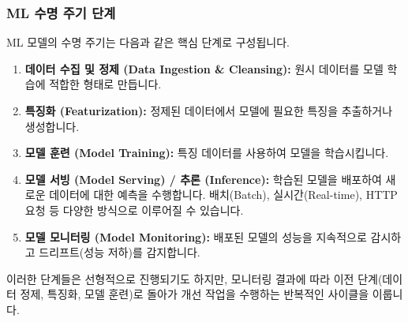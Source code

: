 \documentclass[11pt,a4paper]{article}
\begin{document}
\subsubsection*{ML 수명 주기 단계}
ML 모델의 수명 주기는 다음과 같은 핵심 단계로 구성됩니다.
\begin{enumerate}
    \item \textbf{데이터 수집 및 정제 (Data Ingestion & Cleansing):} 원시 데이터를 모델 학습에 적합한 형태로 만듭니다.
    \item \textbf{특징화 (Featurization):} 정제된 데이터에서 모델에 필요한 특징을 추출하거나 생성합니다.
    \item \textbf{모델 훈련 (Model Training):} 특징 데이터를 사용하여 모델을 학습시킵니다.
    \item \textbf{모델 서빙 (Model Serving) / 추론 (Inference):} 학습된 모델을 배포하여 새로운 데이터에 대한 예측을 수행합니다. 배치(Batch), 실시간(Real-time), HTTP 요청 등 다양한 방식으로 이루어질 수 있습니다.
    \item \textbf{모델 모니터링 (Model Monitoring):} 배포된 모델의 성능을 지속적으로 감시하고 드리프트(성능 저하)를 감지합니다.
\end{enumerate}
이러한 단계들은 선형적으로 진행되기도 하지만, 모니터링 결과에 따라 이전 단계(데이터 정제, 특징화, 모델 훈련)로 돌아가 개선 작업을 수행하는 반복적인 사이클을 이룹니다.
\end{document}
